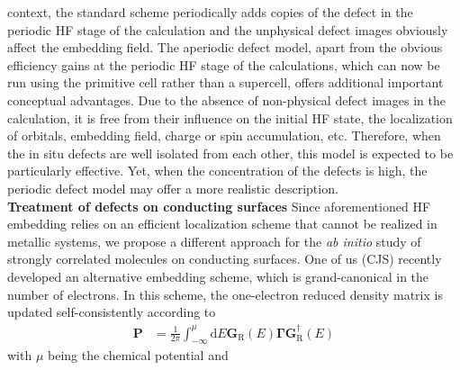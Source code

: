 \documentclass[a4paper,11pt,headings=normal]{scrartcl}
\begin{document}
\begin{itemize}
context, the standard scheme periodically adds copies of the defect in the 
periodic HF stage of 
the calculation and the unphysical defect images obviously affect the embedding 
field. The aperiodic defect model, apart from the obvious efficiency gains at 
the periodic HF stage of the calculations, which can now be run using the 
primitive cell rather than a supercell, offers additional important conceptual 
advantages. Due to the absence of non-physical defect images in the 
calculation, it is free from their influence on the initial HF state, the localization of orbitals, embedding field, charge or spin accumulation, etc. Therefore, when the in situ defects are well isolated from each other, this model is expected to 
be particularly effective. Yet, when the concentration of the defects is high, the periodic defect model may offer a more realistic description.\\
\newpage
\noindent
\textbf{Treatment of defects on conducting surfaces}
Since aforementioned HF embedding relies on an efficient localization scheme that 
cannot be  realized in metallic systems, we propose a different approach for the 
\textit{ab initio} study of strongly correlated molecules on conducting surfaces. 
One of us (CJS) recently developed an alternative embedding scheme, which is 
grand-canonical 
in the number of electrons. In this scheme, the one-electron reduced density 
matrix is updated self-consistently according to
\begin{align}
\mathbf{P} &= \frac{1}{2\pi} \int_{-\infty}^{\mu} \text{d}E \mathbf{G}_\mathrm{R}(E) \mathbf{\Gamma} \mathbf{G}_\mathrm{R}^\dagger(E)
\label{eq_p}
\end{align}
with $\mu$ being the chemical potential and
\begin{align}

\end{align}
\end{itemize}
\end{document}
